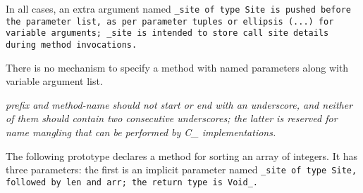 In all cases, an extra argument named \tt{_site} of
type \tt{Site} is pushed before the parameter list,
as per parameter tuples or ellipsis (\tt{...}) for variable arguments;
\tt{_site} is intended to store call site details during method invocations.

\note There is no mechanism to specify a method with
named parameters along with variable argument list.


\it{prefix} and \it{method-name} should not start or end with an underscore,
and neither of them should contain two consecutive underscores; the latter
is reserved for name mangling that can be performed by C\_ implementations.

\example The following prototype declares
a method for sorting an array of integers.
It has three parameters: the first is an implicit parameter named \tt{_site} of
type \tt{Site}, followed by \tt{len} and \tt{arr}; the return type is \tt{Void_}.


